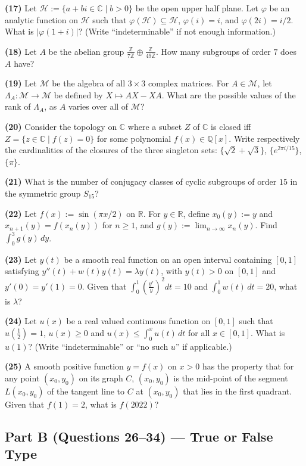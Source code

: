 \documentclass[11pt,a4paper]{article}
\newcommand{\Z}{\mathbb{Z}}
\newcommand{\Q}{\mathbb{Q}}
\newcommand{\R}{\mathbb{R}}
\newcommand{\C}{\mathbb{C}}
\newcommand{\examsec}[1]{%
  \subsection*{#1}
  \vspace{-2pt}
}
\newcommand{\qitem}[1]{\par\medskip\noindent\textbf{#1}\hspace{0.5em}}
\begin{document}
\qitem{(17)} Let $\mathcal{H} := \{a + bi \in \C \mid b > 0\}$ be the open upper half plane. Let $\varphi$ be an analytic function on $\mathcal{H}$ such that $\varphi(\mathcal{H}) \subseteq \mathcal{H}$, $\varphi(i) = i$, and $\varphi(2i) = i/2$. What is $|\varphi(1 + i)|$? (Write ``indeterminable'' if not enough information.)

\qitem{(18)} Let $A$ be the abelian group $\frac{\Z}{7\Z} \oplus \frac{\Z}{49\Z}$. How many subgroups of order $7$ does $A$ have?

\qitem{(19)} Let $\mathcal{M}$ be the algebra of all $3 \times 3$ complex matrices. For $A \in \mathcal{M}$, let $\Lambda_A : \mathcal{M} \to \mathcal{M}$ be defined by $X \mapsto AX - XA$. What are the possible values of the rank of $\Lambda_A$, as $A$ varies over all of $\mathcal{M}$?

\qitem{(20)} Consider the topology on $\C$ where a subset $Z$ of $\C$ is closed iff $Z = \{z \in \C \mid f(z) = 0\}$ for some polynomial $f(x) \in \Q[x]$. Write respectively the cardinalities of the closures of the three singleton sets: $\{\sqrt{2} + \sqrt{3}\}$, $\{e^{2\pi i/15}\}$, $\{\pi\}$.

\qitem{(21)} What is the number of conjugacy classes of cyclic subgroups of order $15$ in the symmetric group $S_{15}$?

\qitem{(22)} Let $f(x) := \sin(\pi x/2)$ on $\R$. For $y \in \R$, define $x_0(y) := y$ and $x_{n+1}(y) = f(x_n(y))$ for $n \ge 1$, and $g(y) := \lim_{n \to \infty} x_n(y)$. Find $\int_0^3 g(y)\,dy$.

\qitem{(23)} Let $y(t)$ be a smooth real function on an open interval containing $[0, 1]$ satisfying $y''(t) + w(t)y(t) = \lambda y(t)$, with $y(t) > 0$ on $[0, 1]$ and $y'(0) = y'(1) = 0$. Given that $\int_0^1 \left(\frac{y'}{y}\right)^2 dt = 10$ and $\int_0^1 w(t)\,dt = 20$, what is $\lambda$?

\qitem{(24)} Let $u(x)$ be a real valued continuous function on $[0, 1]$ such that $u(\frac{1}{2}) = 1$, $u(x) \ge 0$ and $u(x) \le \int_0^x u(t)\,dt$ for all $x \in [0, 1]$. What is $u(1)$? (Write ``indeterminable'' or ``no such $u$'' if applicable.)

\qitem{(25)} A smooth positive function $y = f(x)$ on $x > 0$ has the property that for any point $(x_0, y_0)$ on its graph $C$, $(x_0, y_0)$ is the mid-point of the segment $L(x_0, y_0)$ of the tangent line to $C$ at $(x_0, y_0)$ that lies in the first quadrant. Given that $f(1) = 2$, what is $f(2022)$?

\examsec{Part B (Questions 26--34) --- True or False Type}
\end{document}
